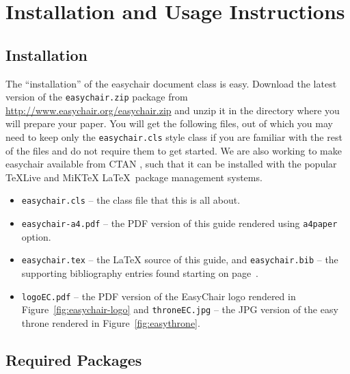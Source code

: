 \documentclass[EPiC]{easychair}
\newcommand{\easychair}{\textsf{easychair}}
\newcommand{\miktex}{MiK{\TeX}}
\begin{document}
\section{Installation and Usage Instructions}
\label{sect:installation-usage}

\subsection{Installation}

The ``installation'' of the {\easychair} document class is easy.
Download the latest version of the \texttt{easychair.zip} package 
from \url{http://www.easychair.org/easychair.zip}
and unzip it in the directory where you will prepare your paper.
You will get the following files, out of which you may need to keep only 
the \texttt{easychair.cls} style class if you are familiar with the rest 
of the files and do not require them to get started.
We are also working to make {\easychair} available from CTAN \cite{ctan},
such that it can be installed with the popular \TeX Live \cite{texlive} and
{\miktex} \cite{miktex} \LaTeX\ package management systems.

\begin{itemize}
\item
\texttt{easychair.cls} -- the class file that this is all about.

\item
\texttt{easychair-a4.pdf} -- the PDF version of this guide rendered using 
\texttt{a4paper} option.

\item
\texttt{easychair.tex} -- the {\LaTeX} source of this guide, 
and
\texttt{easychair.bib} -- the supporting bibliography entries found starting 
on page~\pageref{sect:bib}.

\item
\texttt{logoEC.pdf} -- the PDF version of the EasyChair logo rendered in
Figure~\ref{fig:easychair-logo} and
\texttt{throneEC.jpg} -- the JPG version of the easy throne rendered in 
Figure~\ref{fig:easythrone}.

\end{itemize}

\subsection{Required Packages}
\end{document}
